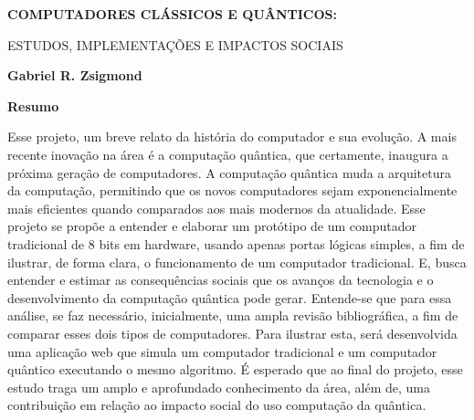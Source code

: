 \thispagestyle{plain}
\begin{center}
    \Large
    \textbf{COMPUTADORES CLÁSSICOS E QUÂNTICOS:}
    
    \vspace{0.2cm}
    \large
    ESTUDOS, IMPLEMENTAÇÕES E IMPACTOS SOCIAIS
    
    \vspace{0.2cm}
    \textbf{Gabriel R. Zsigmond}
    
    \vspace{0.4cm}
    \textbf{Resumo}
\end{center}
Esse projeto, um breve relato da história do computador e sua evolução. A mais recente inovação na área é a computação quântica, que certamente, inaugura a próxima geração de computadores. A computação quântica muda a arquitetura da computação, permitindo que os novos computadores sejam exponencialmente mais eficientes quando comparados aos mais modernos da atualidade. Esse projeto se propõe a entender e elaborar um protótipo de um computador tradicional de 8 bits em hardware, usando apenas portas lógicas simples, a fim de ilustrar, de forma clara, o funcionamento de um computador tradicional. E, busca entender e estimar as consequências sociais que os avanços da tecnologia e o desenvolvimento da computação quântica pode gerar. Entende-se que para essa análise, se faz necessário, inicialmente, uma ampla revisão bibliográfica, a fim de comparar esses dois tipos de computadores. Para ilustrar esta, será desenvolvida uma aplicação web que simula um computador tradicional e um computador quântico executando o mesmo algoritmo. É esperado que ao final do projeto, esse estudo traga um amplo e aprofundado conhecimento da área, além de, uma contribuição em relação ao impacto social do uso computação da quântica.